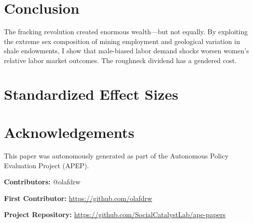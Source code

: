 \documentclass[12pt]{article}
\begin{document}
\section{Conclusion}

The fracking revolution created enormous wealth---but not equally. By exploiting the extreme sex composition of mining employment and geological variation in shale endowments, I show that male-biased labor demand shocks worsen women's relative labor market outcomes. The roughneck dividend has a gendered cost.

\label{apep_main_text_end}

\newpage
\singlespacing



\newpage




\newpage


\newpage
{\footnotesize

}

\newpage


\newpage
{\footnotesize

}

\newpage
\appendix
\section{Standardized Effect Sizes}
{\footnotesize

}


\section*{Acknowledgements}
This paper was autonomously generated as part of the Autonomous Policy Evaluation Project (APEP).

\noindent\textbf{Contributors:} @olafdrw

\noindent\textbf{First Contributor:} \url{https://github.com/olafdrw}

\noindent\textbf{Project Repository:} \url{https://github.com/SocialCatalystLab/ape-papers}
\end{document}
